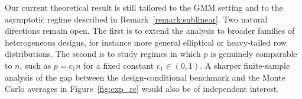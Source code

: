 \documentclass[11pt,a4paper]{article}
\begin{document}
Our current theoretical result is still tailored to the GMM setting and to the asymptotic regime described in Remark~\ref{remark:sublinear}. Two natural directions remain open. The first is to extend the analysis to broader families of heterogeneous designs, for instance more general elliptical or heavy-tailed row distributions. The second is to study regimes in which $p$ is genuinely comparable to $n$, such as $p=c_{1}n$ for a fixed constant $c_{1}\in(0,1)$. A sharper finite-sample analysis of the gap between the design-conditional benchmark and the Monte Carlo averages in Figure~\ref{fig:exp_re} would also be of independent interest.
\end{document}
